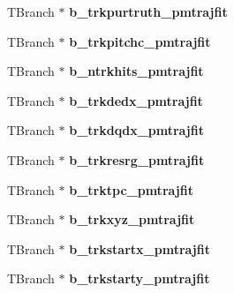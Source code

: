 \begin{DoxyCompactItemize}
\item 
\hypertarget{classanatree_a3e0df2cd601679bc3faccd31bee80520}{T\-Branch $\ast$ {\bfseries b\-\_\-trkpurtruth\-\_\-pmtrajfit}}\label{classanatree_a3e0df2cd601679bc3faccd31bee80520}

\item 
\hypertarget{classanatree_ad2a711b75b0d93066ef892dc06315a15}{T\-Branch $\ast$ {\bfseries b\-\_\-trkpitchc\-\_\-pmtrajfit}}\label{classanatree_ad2a711b75b0d93066ef892dc06315a15}

\item 
\hypertarget{classanatree_ac4b4692c50dc61fd691d97d0fd445554}{T\-Branch $\ast$ {\bfseries b\-\_\-ntrkhits\-\_\-pmtrajfit}}\label{classanatree_ac4b4692c50dc61fd691d97d0fd445554}

\item 
\hypertarget{classanatree_a70824dac2d9890b38a72e0be6ffaea45}{T\-Branch $\ast$ {\bfseries b\-\_\-trkdedx\-\_\-pmtrajfit}}\label{classanatree_a70824dac2d9890b38a72e0be6ffaea45}

\item 
\hypertarget{classanatree_a9e86826eb750074fd480290fb18e7592}{T\-Branch $\ast$ {\bfseries b\-\_\-trkdqdx\-\_\-pmtrajfit}}\label{classanatree_a9e86826eb750074fd480290fb18e7592}

\item 
\hypertarget{classanatree_abac9d506c046cfd2e783361e6801edd7}{T\-Branch $\ast$ {\bfseries b\-\_\-trkresrg\-\_\-pmtrajfit}}\label{classanatree_abac9d506c046cfd2e783361e6801edd7}

\item 
\hypertarget{classanatree_acb6ab2fadf89c222b436ba9b0c5c2559}{T\-Branch $\ast$ {\bfseries b\-\_\-trktpc\-\_\-pmtrajfit}}\label{classanatree_acb6ab2fadf89c222b436ba9b0c5c2559}

\item 
\hypertarget{classanatree_a91c664c04321bf2d8fb280257e1565ca}{T\-Branch $\ast$ {\bfseries b\-\_\-trkxyz\-\_\-pmtrajfit}}\label{classanatree_a91c664c04321bf2d8fb280257e1565ca}

\item 
\hypertarget{classanatree_aced818adb6a35024f9ff8e82c537e5f3}{T\-Branch $\ast$ {\bfseries b\-\_\-trkstartx\-\_\-pmtrajfit}}\label{classanatree_aced818adb6a35024f9ff8e82c537e5f3}

\item 
\hypertarget{classanatree_a019e3a2758fc01a83e5c1afbb2158c38}{T\-Branch $\ast$ {\bfseries b\-\_\-trkstarty\-\_\-pmtrajfit}}\label{classanatree_a019e3a2758fc01a83e5c1afbb2158c38}


\end{DoxyCompactItemize}
